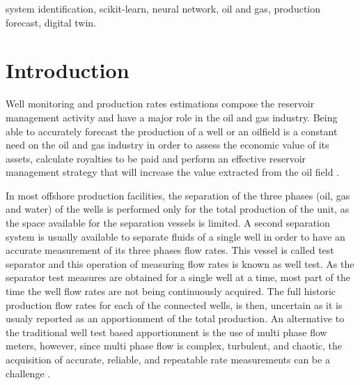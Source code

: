 \documentclass[conference]{IEEEtran}
\begin{document}
\begin{abstract}
\end{abstract}

\begin{IEEEkeywords}
system identification, scikit-learn, neural network, oil and gas, production forecast, digital twin.
\end{IEEEkeywords}

\section{Introduction}\label{section_introduction}

Well monitoring and production rates estimations compose the reservoir management activity and have a major role in the oil and gas industry. Being able to accurately forecast the production of a well or an oilfield is a constant need on the oil and gas industry in order to assess the economic value of its assets, calculate royalties to be paid and perform an effective reservoir management strategy that will increase the value extracted from the oil field \cite{alakeely2022simulating}.

In most offshore production facilities, the separation of the three phases (oil, gas and water) of the wells is performed only for the total production of the unit, as the space available for the separation vessels is limited. A second separation system is usually available to separate fluids of a single well in order to have an accurate measurement of its three phases flow rates. This vessel is called test separator and this operation of measuring flow rates is known as well test. As the separator test measures are obtained for a single well at a time, most part of the time the well flow rates are not being continuously acquired. The full historic production flow rates for each of the connected wells, is then, uncertain as it is usualy reported as an apportionment of the total production. An alternative to the traditional well test based apportionment is the use of multi phase flow meters, however, since multi phase flow is complex, turbulent, and chaotic, the acquisition of accurate, reliable, and repeatable rate measurements can be a challenge \cite{Okotie2016}.
\end{document}
